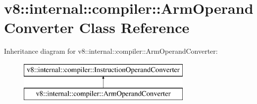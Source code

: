 \hypertarget{classv8_1_1internal_1_1compiler_1_1_arm_operand_converter}{}\section{v8\+:\+:internal\+:\+:compiler\+:\+:Arm\+Operand\+Converter Class Reference}
\label{classv8_1_1internal_1_1compiler_1_1_arm_operand_converter}
Inheritance diagram for v8\+:\+:internal\+:\+:compiler\+:\+:Arm\+Operand\+Converter\+:\begin{figure}[H]
\begin{center}
\leavevmode
\includegraphics[height=2.000000cm]{classv8_1_1internal_1_1compiler_1_1_arm_operand_converter}
\end{center}
\end{figure}
